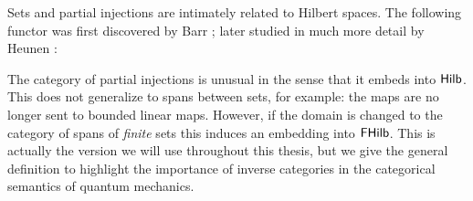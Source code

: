 Sets and partial injections are intimately related to Hilbert spaces.  The following functor was first discovered by Barr \cite{barr}; later studied in much more detail by Heunen \cite{elltwo}:
The category of partial injections is unusual in the sense that it embeds into $\mathsf{Hilb}$. This does not generalize to spans between sets, for example: the maps are no longer sent to bounded linear maps.
However, if the domain is changed to the category of spans of {\em finite} sets this induces an embedding into $\mathsf{FHilb}$.  This is actually the version we will use throughout this thesis, but we give the general definition to highlight the importance of inverse categories in the categorical semantics of quantum mechanics.


